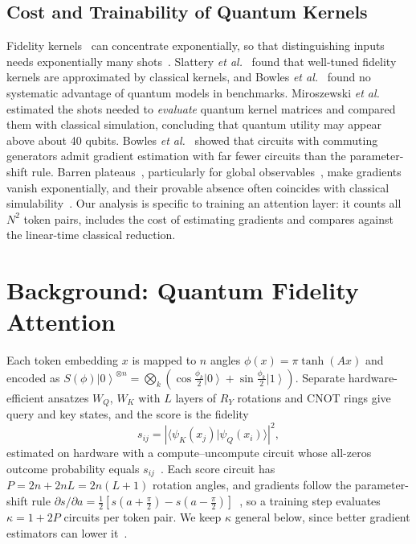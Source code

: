 \documentclass[conference]{IEEEtran}
\theoremstyle{definition}
\newcommand{\ket}[1]{\left|#1\right\rangle}
\begin{document}
\subsection{Cost and Trainability of Quantum Kernels}
Fidelity kernels~\cite{havlicek2019supervised} can concentrate exponentially, so that distinguishing inputs needs exponentially many shots~\cite{thanasilp2024concentration}. Slattery \emph{et al.}~\cite{slattery2023evidence} found that well-tuned fidelity kernels are approximated by classical kernels, and Bowles \emph{et al.}~\cite{bowles2024benchmarking} found no systematic advantage of quantum models in benchmarks. Miroszewski \emph{et al.}~\cite{miroszewski2024shots} estimated the shots needed to \emph{evaluate} quantum kernel matrices and compared them with classical simulation, concluding that quantum utility may appear above about 40 qubits. Bowles \emph{et al.}~\cite{bowles2025backprop} showed that circuits with commuting generators admit gradient estimation with far fewer circuits than the parameter-shift rule. Barren plateaus~\cite{mcclean2018barren}, particularly for global observables~\cite{cerezo2021cost}, make gradients vanish exponentially, and their provable absence often coincides with classical simulability~\cite{cerezo2025simulability}. Our analysis is specific to training an attention layer: it counts all $N^2$ token pairs, includes the cost of estimating gradients and compares against the linear-time classical reduction.

\section{Background: Quantum Fidelity Attention}
\label{sec:prelim}

Each token embedding $x$ is mapped to $n$ angles $\phi(x)=\pi\tanh(Ax)$ and encoded as $S(\phi)\ket{0}^{\otimes n}=\bigotimes_k(\cos\frac{\phi_k}{2}\ket{0}+\sin\frac{\phi_k}{2}\ket{1})$. Separate hardware-efficient ansatzes $W_Q$, $W_K$ with $L$ layers of $R_Y$ rotations and CNOT rings give query and key states, and the score is the fidelity
\begin{equation}
s_{ij}=\left|\langle\psi_K(x_j)|\psi_Q(x_i)\rangle\right|^2,
\end{equation}
estimated on hardware with a compute--uncompute circuit whose all-zeros outcome probability equals $s_{ij}$~\cite{singuru2026fidelity}. Each score circuit has $P=2n+2nL=2n(L+1)$ rotation angles, and gradients follow the parameter-shift rule $\partial s/\partial a=\frac12[s(a+\frac{\pi}{2})-s(a-\frac{\pi}{2})]$~\cite{schuld2019gradients}, so a training step evaluates $\kappa=1+2P$ circuits per token pair. We keep $\kappa$ general below, since better gradient estimators can lower it~\cite{bowles2025backprop}.
\end{document}
